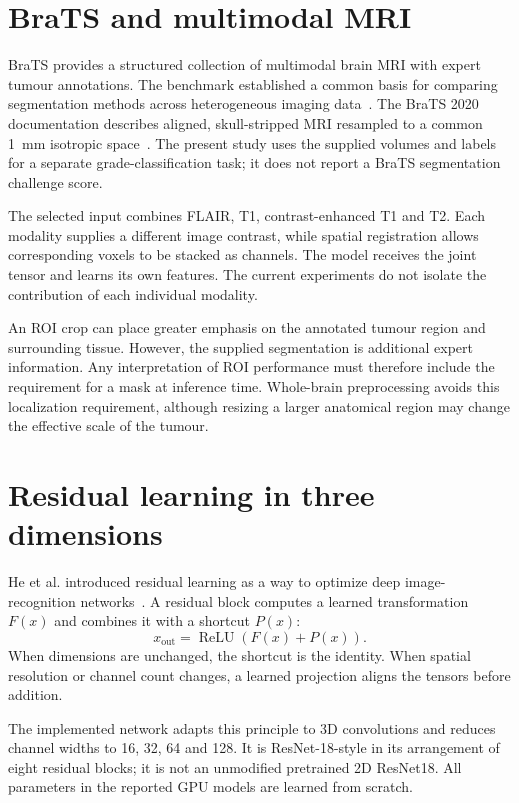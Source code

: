 \documentclass[12pt,a4paper,oneside]{report}
\begin{document}
\section{BraTS and multimodal MRI}
BraTS provides a structured collection of multimodal brain MRI with expert tumour annotations. The benchmark established a common basis for comparing segmentation methods across heterogeneous imaging data~\cite{menze}. The BraTS 2020 documentation describes aligned, skull-stripped MRI resampled to a common 1~mm isotropic space~\cite{brats2020}. The present study uses the supplied volumes and labels for a separate grade-classification task; it does not report a BraTS segmentation challenge score.

The selected input combines FLAIR, T1, contrast-enhanced T1 and T2. Each modality supplies a different image contrast, while spatial registration allows corresponding voxels to be stacked as channels. The model receives the joint tensor and learns its own features. The current experiments do not isolate the contribution of each individual modality.

An ROI crop can place greater emphasis on the annotated tumour region and surrounding tissue. However, the supplied segmentation is additional expert information. Any interpretation of ROI performance must therefore include the requirement for a mask at inference time. Whole-brain preprocessing avoids this localization requirement, although resizing a larger anatomical region may change the effective scale of the tumour.

\section{Residual learning in three dimensions}
He et al. introduced residual learning as a way to optimize deep image-recognition networks~\cite{resnet}. A residual block computes a learned transformation $F(x)$ and combines it with a shortcut $P(x)$:
\begin{equation}
x_{\mathrm{out}}=\operatorname{ReLU}\!\left(F(x)+P(x)\right).
\end{equation}
When dimensions are unchanged, the shortcut is the identity. When spatial resolution or channel count changes, a learned projection aligns the tensors before addition.

The implemented network adapts this principle to 3D convolutions and reduces channel widths to 16, 32, 64 and 128. It is ResNet-18-style in its arrangement of eight residual blocks; it is not an unmodified pretrained 2D ResNet18. All parameters in the reported GPU models are learned from scratch.
\end{document}
